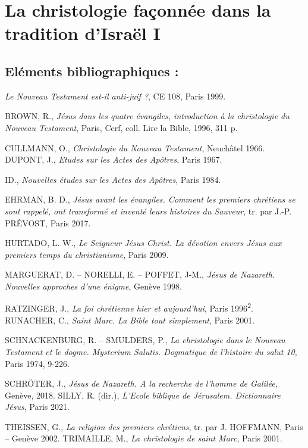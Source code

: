 


 
\chapter{La christologie façonnée dans la tradition d'Israël I}
 
 
\section{Eléments bibliographiques :}

\emph{Le Nouveau Testament est-il anti-juif ?}, CE 108, Paris 1999.

BROWN, R., \emph{Jésus dans les quatre évangiles, introduction à la
christologie du Nouveau Testament}, Paris, Cerf, coll. Lire la Bible,
1996, 311 p.

CULLMANN, O., \emph{Christologie du Nouveau Testament}, Neuchâtel 1966.
DUPONT, J., \emph{Etudes sur les Actes des Apôtres}, Paris 1967.

ID., \emph{Nouvelles études sur les Actes des Apôtres}, Paris 1984.

EHRMAN, B. D., \emph{Jésus avant les évangiles. Comment les premiers
chrétiens se sont rappelé, ont transformé et inventé leurs histoires du
Sauveur}, tr. par J.-P. PRÊVOST, Paris 2017.

HURTADO, L. W., \emph{Le Seigneur Jésus Christ. La dévotion envers Jésus
aux premiers temps du christianisme}, Paris 2009.

MARGUERAT, D. -- NORELLI, E. -- POFFET, J-M., \emph{Jésus de Nazareth.
Nouvelles approches d'une énigme}, Genève 1998.

RATZINGER, J., \emph{La foi chrétienne hier et aujourd'hui}, Paris
1996\textsuperscript{2}. RUNACHER, C., \emph{Saint Marc. La Bible tout
simplement}, Paris 2001.

SCHNACKENBURG, R. -- SMULDERS, P., \emph{La christologie dans le Nouveau
Testament et le dogme. Mysterium Salutis. Dogmatique de l'histoire du
salut 10}, Paris 1974, 9-226.

SCHRÖTER, J., \emph{Jésus de Nazareth. A la recherche de l'homme de
Galilée}, Genève, 2018. SILLY, R. (dir.), \emph{L'Ecole biblique de
Jérusalem. Dictionnaire Jésus}, Paris 2021.

THEISSEN, G., \emph{La religion des premiers chrétiens}, tr. par J.
HOFFMANN, Paris -- Genève 2002. TRIMAILLE, M., \emph{La christologie de
saint Marc}, Paris 2001.


